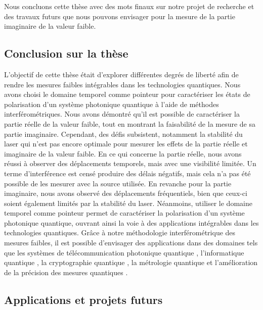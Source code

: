 \begin{onehalfspace}

    Nous concluons cette thèse avec des mots finaux sur
    notre projet de recherche et des travaux futurs que nous pouvons
    envisager pour la mesure de la partie imaginaire de la valeur faible.

    \subsection{Conclusion sur la thèse}
    L'objectif de cette thèse était d'explorer différentes
    degrés de liberté afin de rendre les mesures faibles
    intégrables dans les technologies quantiques. Nous avons
    choisi le domaine temporel comme pointeur pour
    caractériser les états de polarisation d'un système photonique
    quantique à l'aide de méthodes interférométriques.
    Nous avons démontré qu'il est possible de caractériser
    la partie réelle de la valeur faible, tout en montrant
    la faisabilité de la mesure de sa partie imaginaire. Cependant,
    des défis subsistent, notamment la stabilité du laser qui n'est pas encore optimale
    pour mesurer les effets de la partie réelle et imaginaire de la valeur faible.
    En ce qui concerne la partie réelle, nous avons réussi à observer des
    déplacements temporels, mais avec une visibilité limitée. Un terme
    d'interférence est censé produire des délais négatifs, mais cela
    n'a pas été possible de les mesurer avec la source utilisée. En revanche pour 
    la partie imaginaire, nous avons
    observé des déplacements fréquentiels, bien que ceux-ci soient
    également limités par la stabilité du laser. Néanmoins, utiliser le
    domaine temporel comme pointeur permet de caractériser la
    polarisation d’un système photonique quantique, ouvrant ainsi la
    voie à des applications intégrables dans les technologies
    quantiques. Grâce à notre méthodologie interférométrique des
    mesures faibles, il est possible d’envisager des applications dans
    des domaines tels que les systèmes de télécommunication photonique
    quantique \cite{OpticalNetworks,Brunner_2004}, l’informatique
    quantique \cite{quantuminfoweak}, la cryptographie quantique
    \cite{troupe2017quantumcryptographyweakmeasurements}, la métrologie
    quantique et l’amélioration de la précision des mesures quantiques
    \cite{intlundeen}.
    
    \subsection{Applications et projets futurs}


\end{onehalfspace}
